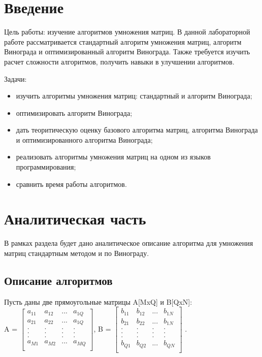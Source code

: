 \documentclass[a4paper,12pt]{report}
\begin{document}
	\setcounter{page}{2}
	\tableofcontents
    \chapter*{Введение}

		Цель работы: изучение алгоритмов умножения матриц. 
		В данной лабораторной работе рассматривается стандартный алгоритм умножения матриц, алгоритм Винограда и оптимизированный алгоритм Винограда. 
		Также требуется изучить расчет сложности алгоритмов, получить навыки в улучшении алгоритмов.
		
		Задачи:
		\begin{itemize}
			\item изучить алгоритмы умножения матриц: стандартный и алгоритм Винограда;
			\item оптимизировать алгоритм Винограда;
			\item дать теоритическую оценку базового алгоритма матриц, алгоритма Винограда и оптимизированного алгоритма Винограда;
			\item реализовать алгоритмы умножения матриц на одном из языков программирования;
			\item сравнить время работы алгоритмов.
		\end{itemize}
	\label{sec:intro}

    \newpage

    \chapter{Аналитическая часть}
        \label{sec:analitic_part}

			В рамках раздела будет дано аналитическое описание алгоритма для умножения матриц стандартным методом и по Винограду.

	\section{Описание алгоритмов}
        
			Пусть даны две прямоугольные матрицы A[MxQ] и B[QxN]:\\
			A = $\begin{bmatrix}
				a_{11}& a_{12}& ...& a_{1Q}\\
				a_{21}& a_{22}& ...& a_{1Q}\\
				.& .& .& .\\
				.& .& .& .\\
				.& .& .& .\\
				a_{M1}& a_{M2}& ...& a_{MQ}\\
			\end{bmatrix}$, B = $\begin{bmatrix}
				b_{11}& b_{12}& ...& b_{1N}\\
				b_{21}& b_{22}& ...& b_{1N}\\
				.& .& .& .\\
				.& .& .& .\\
				.& .& .& .\\
				b_{Q1}& b_{Q2}& ...& b_{QN}\\
			\end{bmatrix}$ .
			
\end{document}

